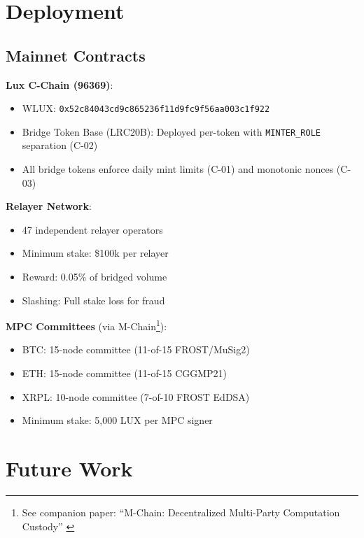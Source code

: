 \documentclass[11pt]{article}
\begin{document}
\section{Deployment}

\subsection{Mainnet Contracts}

\textbf{Lux C-Chain (96369)}:
\begin{itemize}[leftmargin=1.1em]
  \item WLUX: \texttt{0x52c84043cd9c865236f11d9fc9f56aa003c1f922}
  \item Bridge Token Base (LRC20B): Deployed per-token with \texttt{MINTER\_ROLE} separation (C-02)
  \item All bridge tokens enforce daily mint limits (C-01) and monotonic nonces (C-03)
\end{itemize}

\textbf{Relayer Network}:
\begin{itemize}[leftmargin=1.1em]
  \item 47 independent relayer operators
  \item Minimum stake: \$100k per relayer
  \item Reward: 0.05\% of bridged volume
  \item Slashing: Full stake loss for fraud
\end{itemize}

\textbf{MPC Committees} (via M-Chain\footnote{See companion paper: ``M-Chain: Decentralized Multi-Party Computation Custody'' \cite{mchain}}):
\begin{itemize}[leftmargin=1.1em]
  \item BTC: 15-node committee (11-of-15 FROST/MuSig2)
  \item ETH: 15-node committee (11-of-15 CGGMP21)
  \item XRPL: 10-node committee (7-of-10 FROST EdDSA)
  \item Minimum stake: 5,000 LUX per MPC signer
\end{itemize}

\section{Future Work}
\end{document}
